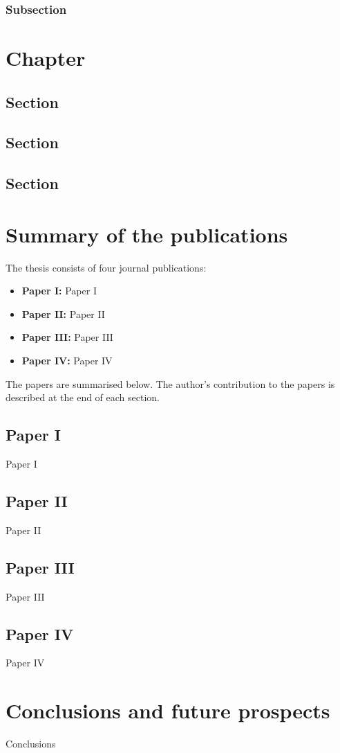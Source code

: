 \documentclass[a4paper,11pt,english]{report}
\newlength{\defbaselineskip}
\newcommand{\setlinespacing}[1]{\setlength{\baselineskip}{#1 \defbaselineskip}}
\begin{document}
\subsection{Subsection}

\chapter{Chapter}

\section{Section}

\section{Section}

\section{Section}

\chapter{Summary of the publications}
The thesis consists of four journal publications:
\begin{itemize}
  \item \textbf{Paper I:} Paper I
  \item \textbf{Paper II:} Paper II
  \item \textbf{Paper III:} Paper III
  \item \textbf{Paper IV:} Paper IV
\end{itemize}
The papers are summarised below. The author's contribution to the papers is described at the end of each section.

\section{Paper I}
Paper I

\section{Paper II}
Paper II

\section{Paper III}
Paper III

\section{Paper IV}
Paper IV

\chapter{Conclusions and future prospects}
Conclusions

\setlinespacing{1.0}



\end{document}
